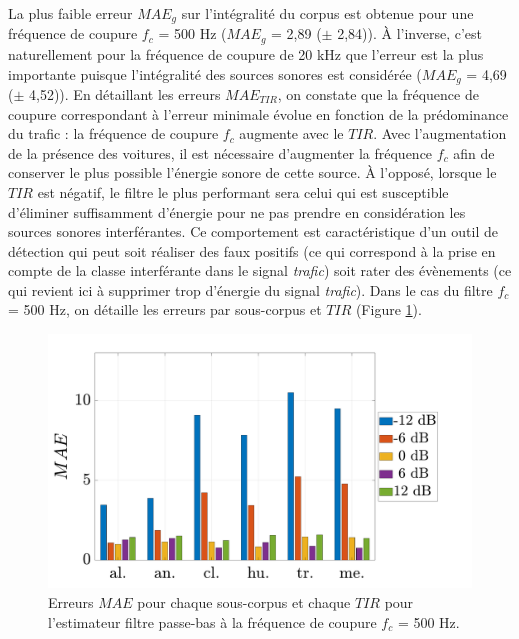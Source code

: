La plus faible erreur $MAE_g$ sur l'intégralité du corpus est obtenue pour une fréquence de coupure $f_c$ = 500 Hz ($MAE_g$ = 2,89 ($\pm$ 2,84)).
\`A l'inverse, c'est naturellement pour la fréquence de coupure de 20 kHz que l'erreur est la plus importante puisque l'intégralité des sources sonores est considérée ($MAE_g$ = 4,69 ($\pm$ 4,52)).
En détaillant les erreurs $MAE_{TIR}$, on constate que la fréquence de coupure correspondant à l'erreur minimale évolue en fonction de la prédominance du trafic : la fréquence de coupure $f_c$ augmente avec le $TIR$.
Avec l'augmentation de la présence des voitures, il est nécessaire d'augmenter la fréquence $f_c$ afin de conserver le plus possible l'énergie sonore de cette source. \`A l'opposé, lorsque le $TIR$ est négatif, le filtre le plus performant sera celui qui est susceptible d'éliminer suffisamment d'énergie pour ne pas prendre en considération les sources sonores interférantes. Ce comportement est caractéristique d'un outil de détection qui peut soit réaliser des faux positifs (ce qui correspond à la prise en compte de la classe interférante dans le signal \textit{trafic}) soit rater des évènements (ce qui revient ici à supprimer trop d'énergie du signal \textit{trafic}).
Dans le cas du filtre $f_c$ = 500 Hz,  on détaille les erreurs par sous-corpus et $TIR$ (Figure \ref{fig:filtre_amb_tir}).

\begin{figure}[h!]
\centering
\includegraphics[width=0.7\linewidth]{./figures/resultats/amb_filtre_500_bar.pdf}
\caption{Erreurs $MAE$ pour chaque sous-corpus et chaque $TIR$ pour l'estimateur filtre passe-bas à la fréquence de coupure $f_c$ = 500 Hz.}
\label{fig:filtre_amb_tir}
\end{figure}


